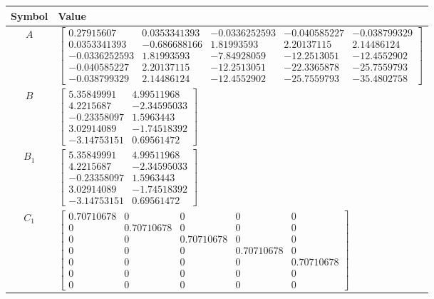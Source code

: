 \begin{tabular}{cl}
\hline
  Symbol  & Value                                                                                                                                                                                                                                                                                                                                                                                                \\
\hline
   $A$    & $\left[\begin{matrix}0.27915607 & 0.0353341393 & -0.0336252593 & -0.040585227 & -0.038799329\\0.0353341393 & -0.686688166 & 1.81993593 & 2.20137115 & 2.14486124\\-0.0336252593 & 1.81993593 & -7.84928059 & -12.2513051 & -12.4552902\\-0.040585227 & 2.20137115 & -12.2513051 & -22.3365878 & -25.7559793\\-0.038799329 & 2.14486124 & -12.4552902 & -25.7559793 & -35.4802758\end{matrix}\right]$ \\
   $B$    & $\left[\begin{matrix}5.35849991 & 4.99511968\\4.2215687 & -2.34595033\\-0.23358097 & 1.5963443\\3.02914089 & -1.74518392\\-3.14753151 & 0.69561472\end{matrix}\right]$                                                                                                                                                                                                                               \\
 $B_{1}$  & $\left[\begin{matrix}5.35849991 & 4.99511968\\4.2215687 & -2.34595033\\-0.23358097 & 1.5963443\\3.02914089 & -1.74518392\\-3.14753151 & 0.69561472\end{matrix}\right]$                                                                                                                                                                                                                               \\
 $C_{1}$  & $\left[\begin{matrix}0.70710678 & 0 & 0 & 0 & 0\\0 & 0.70710678 & 0 & 0 & 0\\0 & 0 & 0.70710678 & 0 & 0\\0 & 0 & 0 & 0.70710678 & 0\\0 & 0 & 0 & 0 & 0.70710678\\0 & 0 & 0 & 0 & 0\\0 & 0 & 0 & 0 & 0\end{matrix}\right]$                                                                                                                                                                            \\

\end{tabular}
